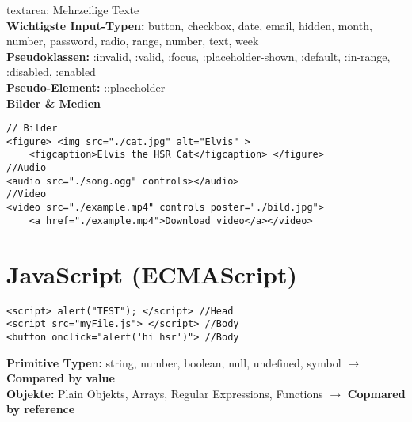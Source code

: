\documentclass[7pt,landscape,a4paper]{scrartcl}
\begin{document}
\begin{multicols*}{4}
	textarea: Mehrzeilige Texte\\
	\textbf{Wichtigste Input-Typen:} button, checkbox, date, email, hidden, month, number, password, radio, range, number, text, week\\
	\textbf{Pseudoklassen:} :invalid, :valid, :focus, :placeholder-shown, :default, :in-range, :disabled, :enabled\\
	\textbf{Pseudo-Element:} ::placeholder\\
	\textcolor{b}{\textbf{Bilder \& Medien}}
\begin{lstlisting}[style=htmlcssjs]
// Bilder
<figure> <img src="./cat.jpg" alt="Elvis" >
	<figcaption>Elvis the HSR Cat</figcaption> </figure>
//Audio
<audio src="./song.ogg" controls></audio>
//Video
<video src="./example.mp4" controls poster="./bild.jpg">
	<a href="./example.mp4">Download video</a></video>
\end{lstlisting}
\section{JavaScript (ECMAScript)}
\begin{lstlisting}[style=htmlcssjs]
<script> alert("TEST"); </script> //Head
<script src="myFile.js"> </script> //Body
<button onclick="alert('hi hsr')"> //Body
\end{lstlisting}
	\textcolor{b}{\textbf{Primitive Typen:}} string, number, boolean, null, undefined, symbol $\rightarrow$ \textbf{Compared by value}\\
	\textcolor{b}{\textbf{Objekte:}} Plain Objekts, Arrays, Regular Expressions, Functions $\rightarrow$ \textbf{Copmared by reference}

\end{multicols*}
\end{document}
